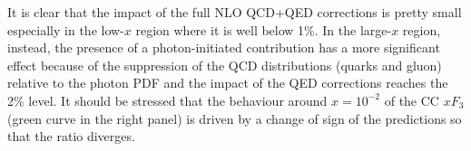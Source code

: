 
It is clear that the impact of the full NLO QCD+QED corrections is
pretty small especially in the low-$x$ region where it is well below
1\%. In the large-$x$ region, instead, the presence of a
photon-initiated contribution has a more significant effect because of
the suppression of the QCD distributions (quarks and gluon) relative
to the photon PDF and the impact of the QED corrections reaches the
2\% level. It should be stressed that the behaviour around $x=10^{-2}$
of the CC $xF_3$ (green curve in the right panel) is driven by a
change of sign of the predictions so that the ratio diverges.
